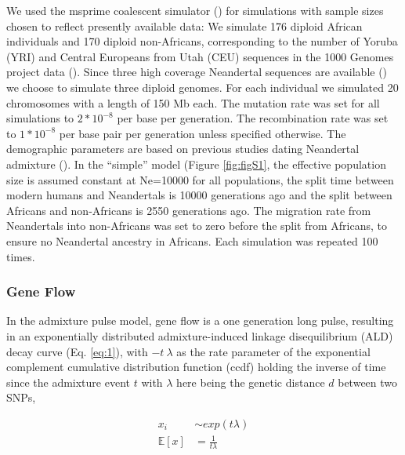\documentclass[]{article}
\begin{document}
We used the msprime coalescent simulator
(\cite{kelleher_efficient_2016}) for simulations with sample sizes
chosen to reflect presently available data: We simulate 176 diploid
African individuals and 170 diploid non-Africans, corresponding to the
number of Yoruba (YRI) and Central Europeans from Utah (CEU)
sequences in the 1000 Genomes project data
(\cite{the_1000_genomes_project_consortium_global_2015}). Since three
high coverage Neandertal sequences are available
(\cite{prufer_complete_2013,prufer_high-coverage_2017,mafessoni_high_coverage_2020}) we choose to
simulate three diploid genomes. For each individual we simulated 20
chromosomes with a length of 150 Mb each. The mutation rate was set for
all simulations to \(2*10^{-8}\) per base per generation. The
recombination rate was set to \(1*10^{-8}\) per base pair per generation
unless specified otherwise. The demographic parameters are based on
previous studies dating Neandertal admixture
(\cite{sankararaman_date_2012,fu_genome_2014,moorjani_genetic_2016}). In
the ``simple'' model (Figure \ref{fig:figS1}, the effective
population size is assumed constant at Ne=10000 for all populations, the
split time between modern humans and Neandertals is 10000 generations
ago and the split between Africans and non-Africans is 2550
generations ago. The migration rate from Neandertals into non-Africans
was set to zero before the split from Africans, to ensure no Neandertal
ancestry in Africans. Each simulation was repeated 100 times.

\subsubsection{Gene Flow}\label{gene flow}

In the admixture pulse model, gene flow is a one generation long pulse,
resulting in an exponentially distributed admixture-induced linkage
disequilibrium (ALD) decay curve (Eq. \ref{eq:1}), with $-t \:\lambda$ as
the rate parameter of the exponential complement cumulative distribution function (ccdf) holding the inverse
of time since the admixture event $t$ with $\lambda$ here being the genetic
distance \(d\) between two SNPs,

\begin{equation}
\begin{split}
\label{eq:1}
x_i &\sim exp(t\lambda) \\
\mathbb{E}[x] &= \frac{1}{t\lambda}
\end{split}
\end{equation}
\end{document}
